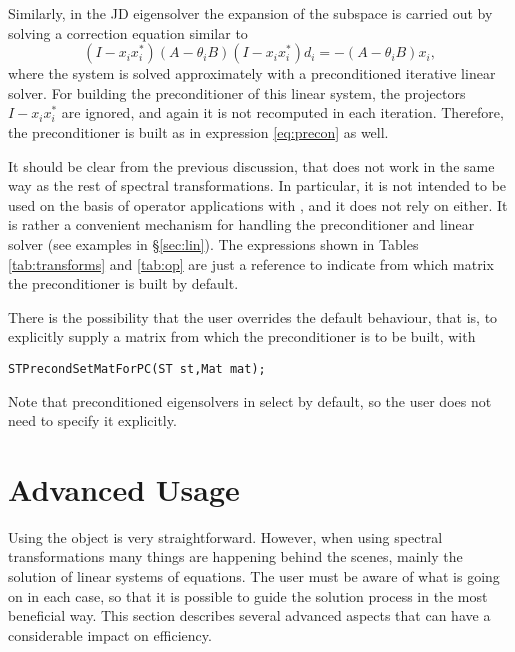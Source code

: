 	Similarly, in the JD eigensolver the expansion of the subspace is carried out by solving a correction equation similar to
\begin{equation}
(I-x_ix_i^*)(A-\theta_i B)(I-x_ix_i^*)d_i=-(A-\theta_i B)x_i,
\end{equation}
where the system is solved approximately with a preconditioned iterative linear solver. For building the preconditioner of this linear system, the projectors $I-x_ix_i^*$ are ignored, and again it is not recomputed in each iteration. Therefore, the preconditioner is built as in expression \ref{eq:precon} as well.

	It should be clear from the previous discussion, that  does not work in the same way as the rest of spectral transformations. In particular, it is not intended to be used on the basis of operator applications with , and it does not rely on  either. It is rather a convenient mechanism for handling the preconditioner and linear solver (see examples in \S\ref{sec:lin}). The expressions shown in Tables \ref{tab:transforms} and \ref{tab:op} are just a reference to indicate from which matrix the preconditioner is built by default.

	There is the possibility that the user overrides the default behaviour, that is, to explicitly supply a matrix from which the preconditioner is to be built, with
	\begin{Verbatim}[fontsize=\small]
	STPrecondSetMatForPC(ST st,Mat mat);
	\end{Verbatim}

	Note that preconditioned eigensolvers in  select  by default, so the user does not need to specify it explicitly.

\section{Advanced Usage}

Using the  object is very straightforward. However, when using spectral transformations many things are happening behind the scenes, mainly the solution of linear systems of equations. The user must be aware of what is going on in each case, so that it is possible to guide the solution process in the most beneficial way. This section describes several advanced aspects that can have a considerable impact on efficiency.

